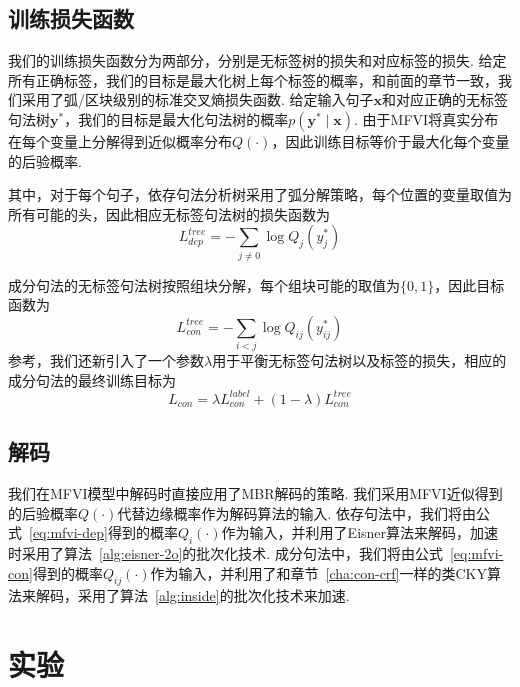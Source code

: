 \subsection{训练损失函数}

我们的训练损失函数分为两部分，分别是无标签树的损失和对应标签的损失.
给定所有正确标签，我们的目标是最大化树上每个标签的概率，和前面的章节一致，我们采用了弧/区块级别的标准交叉熵损失函数.
给定输入句子$\boldsymbol{x}$和对应正确的无标签句法树$\boldsymbol{y}^{\ast}$，我们的目标是最大化句法树的概率$p(\boldsymbol{y}^{\ast}\mid\boldsymbol{x})$.
由于MFVI将真实分布在每个变量上分解得到近似概率分布$Q(\cdot)$，因此训练目标等价于最大化每个变量的后验概率.

其中，对于每个句子，依存句法分析树采用了弧分解策略，每个位置的变量取值为所有可能的头，因此相应无标签句法树的损失函数为
\begin{equation}
  \label{eq:dep-vi-arc-loss}
  L_{dep}^{tree}=-\sum_{j\neq 0}\log Q_j(y^{\ast}_j)
\end{equation}

成分句法的无标签句法树按照组块分解，每个组块可能的取值为$\{0,1\}$，因此目标函数为
\begin{equation}
  \label{eq:con-vi-bracket-loss}
  L_{con}^{tree}=-\sum_{i<j}\log Q_{ij}(y^{\ast}_{ij})
\end{equation}
参考\citet{dozat-manning-2018-simpler}，我们还新引入了一个参数$\lambda$用于平衡无标签句法树以及标签的损失，相应的成分句法的最终训练目标为
\begin{equation}
  \label{eq:con-vi-loss}
  L_{con}=\lambda L_{con}^{label}+(1-\lambda)L_{con}^{tree}
\end{equation}

\subsection{解码}
我们在MFVI模型中解码时直接应用了MBR解码的策略.
我们采用MFVI近似得到的后验概率$Q(\cdot)$代替边缘概率作为解码算法的输入.
依存句法中，我们将由公式~\ref{eq:mfvi-dep}得到的概率$Q_i(\cdot)$作为输入，并利用了Eisner算法来解码，加速时采用了算法~\ref{alg:eisner-2o}的批次化技术.
成分句法中，我们将由公式~\ref{eq:mfvi-con}得到的概率$Q_{ij}(\cdot)$作为输入，并利用了和章节~\ref{cha:con-crf}一样的类CKY算法来解码，采用了算法~\ref{alg:inside}的批次化技术来加速.

\section{实验}\label{sec:vi-exp}

